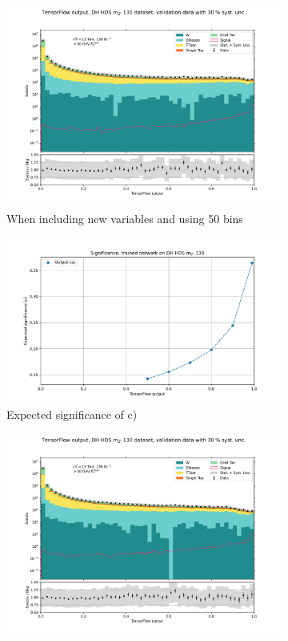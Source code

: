 \documentclass[14pt, a4paper]{book}
\begin{document}
\begin{figure}[!ht]
\begin{subfigure}[b]{0.49\textwidth}
      \includegraphics[width=1\textwidth]{new_variables/VAL.pdf}
      \caption{When including new variables and using 50 bins}
   \end{subfigure}
   \hfill
   \begin{subfigure}[b]{0.49\textwidth}
      \centering
      \includegraphics[width=1\textwidth]{new_variables/EXP_SIG.pdf}
      \caption{Expected significance of c)}
   \end{subfigure}
   \hfill
	\begin{subfigure}[b]{0.49\textwidth}
      \centering
      \includegraphics[width=1\textwidth]{no_pad/VAL.pdf}

\end{subfigure}
\end{figure}
\end{document}
